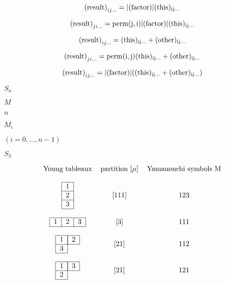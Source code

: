 \documentclass{article}
\begin{document}
\[ {(\rm{result})}_{ij...} = |(\rm{factor})| (\rm{this})_{ij...} \]
\pagebreak

\[ {(\rm{result})}_{ji...} = \rm{perm}(j,i) |(\rm{factor})| (\rm{this})_{ij...} \]
\pagebreak

\[ {(\rm{result})}_{ij...} = (\rm{this})_{ij...} + (\rm{other})_{ij...} \]
\pagebreak

\[ {(\rm{result})}_{ji...} = \rm{perm}(i,j) (\rm{this})_{ij...} + (\rm{other})_{ij...} \]
\pagebreak

\[ {(\rm{result})}_{ij...} = |(\rm{factor})| ((\rm{this})_{ij...} + (\rm{other})_{ij...}) \]
\pagebreak

$ S_n $
\pagebreak

$ M $
\pagebreak

$ n $
\pagebreak

$ M_i $
\pagebreak

$ (i = 0, \dots , n-1) $
\pagebreak

$ S_3 $
\pagebreak

\[ \begin{tabular}{ c c c } Young tableaux & partition [$\mu$] & Yamanouchi symbols M \\ & & \\ \begin{tabular}{ |c| } \hline 1 \\ \hline 2 \\ \hline 3 \\ \hline \end{tabular} & [111] & 123 \\ & & \\ \begin{tabular}{ |c|c|c| } \hline 1 & 2 & 3 \\ \hline \end{tabular} & [3] & 111 \\ & & \\ \begin{tabular}{ |c|c } \hline 1 & \multicolumn{1}{|c|}{2} \\ \hline 3 \\ \cline{1-1} \end{tabular} & [21] & 112 \\ & & \\ \begin{tabular}{ |c|c } \hline 1 & \multicolumn{1}{|c|}{3} \\ \hline 2 \\ \cline{1-1} \end{tabular} & [21] & 121 \\ \end{tabular} \]
\pagebreak
\end{document}
